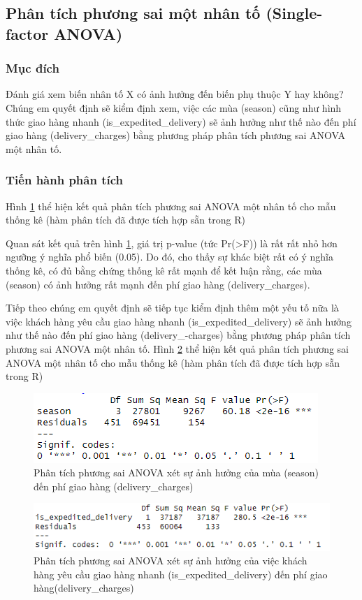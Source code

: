 \subsection{Phân tích phương sai một nhân tố (Single-factor ANOVA)} \label{anova1}
\subsubsection{Mục đích}
Đánh giá xem biến nhân tố X có ảnh hưởng đến biến phụ thuộc Y hay không? Chúng em quyết định sẽ kiểm định xem, việc các mùa (season) cũng như hình thức giao hàng nhanh (is\_expedited\_delivery) sẽ ảnh hưởng như thế nào đến phí giao hàng (delivery\_charges) bằng phương pháp phân tích phương sai ANOVA một nhân tố.
\subsubsection{Tiến hành phân tích}
Hình \ref{fig:5.1} thể hiện kết quả phân tích phương sai ANOVA một nhân tố cho mẫu thống kê (hàm phân tích đã được tích hợp sẵn trong R)

Quan sát kết quả trên hình \ref{fig:5.1}, giá trị p-value (tức Pr(>F)) là rất rất nhỏ hơn ngưỡng ý nghĩa phổ biến (0.05). Do đó, cho thấy sự
khác biệt rất có ý nghĩa thống kê, có đủ bằng chứng thống kê rất mạnh để kết luận rằng, các mùa (season) có ảnh hưởng rất mạnh đến phí giao hàng (delivery\_charges).

Tiếp theo chúng em quyết định sẽ tiếp tục kiểm định thêm một yếu tố nữa là việc khách hàng yêu cầu giao hàng nhanh (is\_expedited\_delivery) sẽ ảnh hưởng như thế nào đến phí giao hàng (delivery\_-charges) bằng phương pháp phân tích phương sai ANOVA một nhân tố. Hình \ref{fig:5.2} thể hiện kết quả phân tích phương sai ANOVA một nhân tố cho mẫu thống kê (hàm phân tích đã được tích hợp sẵn trong R)
\begin{figure}[!htbp]
    \centering
    \includegraphics[width=0.6\linewidth]{graphics/5.3.1.png}
    \caption{Phân tích phương sai ANOVA xét sự ảnh hưởng của mùa (season) đến phí giao hàng (delivery\_charges)}
    \label{fig:5.1}
\end{figure}

\begin{figure}[!htbp]
    \centering
    \includegraphics[width=0.7\linewidth]{graphics/5.3.2.png}
    \caption{Phân tích phương sai ANOVA xét sự ảnh hưởng của việc khách hàng yêu cầu giao hàng nhanh (is\_expedited\_delivery) đến phí giao hàng(delivery\_charges)}
    \label{fig:5.2}
\end{figure}

